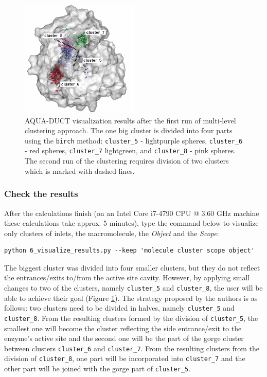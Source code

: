 \documentclass[9pt,tutorial]{livecoms}
\begin{document}
\begin{figure}[ht!]
\centering
\includegraphics[width=0.5\textwidth]{Tut2.1.png}
\caption{AQUA-DUCT visualization results after the first run of multi-level clustering approach. The one big cluster is divided into four parts using the \texttt{birch} method: \texttt{cluster\_5} - lightpurple spheres, \texttt{cluster\_6} - red spheres, \texttt{cluster\_7} lightgreen, and \texttt{cluster\_8} - pink spheres. The second run of the clustering requires division of two clusters which is marked with dashed lines.}
\label{Tut2.1}
\end{figure}

\subsubsection{Check the results}
After the calculations finish (on an Intel Core i7-4790 CPU @ 3.60 GHz machine these calculations take approx. 5 minutes), type the command below to visualize only clusters of inlets, the macromolecule, the \emph{Object} and the \emph{Scope}:
\begin{lstlisting}[columns=fullflexible]
python 6_visualize_results.py --keep 'molecule cluster scope object'
\end{lstlisting}

The biggest cluster was divided into four smaller clusters, but they do not reflect the entrances/exits to/from the active site cavity. However, by applying small changes to two of the clusters, namely \texttt{cluster\_5} and \texttt{cluster\_8}, the user will be able to achieve their goal (Figure \ref{Tut2.1}). The strategy proposed by the authors is as follows: two clusters need to be divided in halves, namely \texttt{cluster\_5} and \texttt{cluster\_8}. From the resulting clusters formed by the division of \texttt{cluster\_5}, the smallest one will become the cluster reflecting the side entrance/exit to the enzyme's active site and the second one will be the part of the gorge cluster between clusters \texttt{cluster\_6} and \texttt{cluster\_7}. From the resulting clusters from the division of \texttt{cluster\_8}, one part will be incorporated into \texttt{cluster\_7} and the other part will be joined with the gorge part of \texttt{cluster\_5}. 
\end{document}
